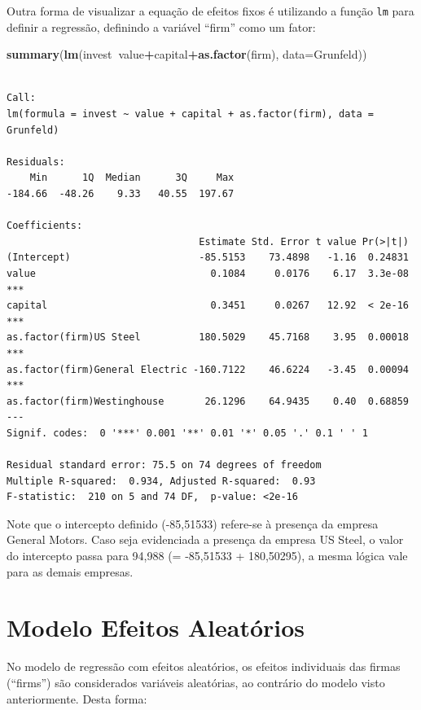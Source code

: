\documentclass[12pt,brazil,oneside]{book}
\newenvironment{Shaded}{\begin{snugshade}}{\end{snugshade}}
\newcommand{\DataTypeTok}[1]{\textcolor[rgb]{0.13,0.29,0.53}{#1}}
\newcommand{\KeywordTok}[1]{\textcolor[rgb]{0.13,0.29,0.53}{\textbf{#1}}}
\newcommand{\NormalTok}[1]{#1}
\newcommand{\OperatorTok}[1]{\textcolor[rgb]{0.81,0.36,0.00}{\textbf{#1}}}
\begin{document}
Outra forma de visualizar a equação de efeitos fixos é utilizando a função \texttt{lm} para definir a regressão, definindo a variável ``firm'' como um fator:

\begin{Shaded}
\begin{Highlighting}[]
\KeywordTok{summary}\NormalTok{(}\KeywordTok{lm}\NormalTok{(invest}\OperatorTok{~}\NormalTok{value}\OperatorTok{+}\NormalTok{capital}\OperatorTok{+}\KeywordTok{as.factor}\NormalTok{(firm), }
           \DataTypeTok{data=}\NormalTok{Grunfeld))}
\end{Highlighting}
\end{Shaded}

\begin{verbatim}

Call:
lm(formula = invest ~ value + capital + as.factor(firm), data = Grunfeld)

Residuals:
    Min      1Q  Median      3Q     Max 
-184.66  -48.26    9.33   40.55  197.67 

Coefficients:
                                 Estimate Std. Error t value Pr(>|t|)    
(Intercept)                      -85.5153    73.4898   -1.16  0.24831    
value                              0.1084     0.0176    6.17  3.3e-08 ***
capital                            0.3451     0.0267   12.92  < 2e-16 ***
as.factor(firm)US Steel          180.5029    45.7168    3.95  0.00018 ***
as.factor(firm)General Electric -160.7122    46.6224   -3.45  0.00094 ***
as.factor(firm)Westinghouse       26.1296    64.9435    0.40  0.68859    
---
Signif. codes:  0 '***' 0.001 '**' 0.01 '*' 0.05 '.' 0.1 ' ' 1

Residual standard error: 75.5 on 74 degrees of freedom
Multiple R-squared:  0.934, Adjusted R-squared:  0.93 
F-statistic:  210 on 5 and 74 DF,  p-value: <2e-16
\end{verbatim}

Note que o intercepto definido (-85,51533) refere-se à presença da empresa General Motors. Caso seja evidenciada a presença da empresa US Steel, o valor do intercepto passa para 94,988 (= -85,51533 + 180,50295), a mesma lógica vale para as demais empresas.

\hypertarget{modelo-efeitos-aleatorios}{%
\section{Modelo Efeitos Aleatórios}\label{modelo-efeitos-aleatorios}}

No modelo de regressão com efeitos aleatórios, os efeitos individuais das firmas (``firms'') são considerados variáveis aleatórias, ao contrário do modelo visto anteriormente. Desta forma:
\end{document}
